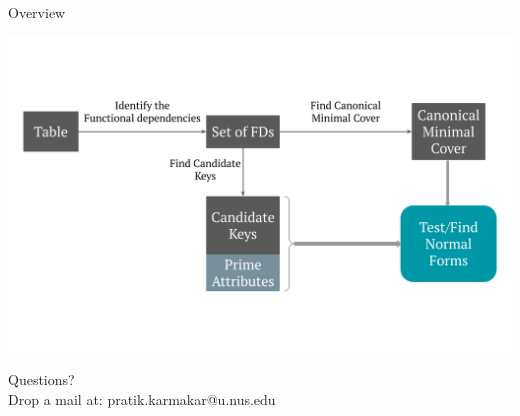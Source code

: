 \documentclass[UTF8]{beamer}
\begin{document}
\begin{frame}{Overview}
\begin{center}
    \includegraphics[width = 1\linewidth]{fd_norm_images/05.png}
\end{center}
\end{frame}

\begin{frame}
\begin{center}
Questions?\\
Drop a mail at: pratik.karmakar@u.nus.edu
\end{center}
\end{frame}
\end{document}
